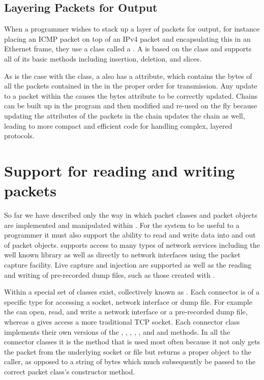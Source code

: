 \documentclass{sig-alternate-10pt}
\begin{document}
\subsection{Layering Packets for Output}
\label{sec:layering-packets-for-output}

When a programmer wishes to stack up a layer of packets for output,
for instance placing an ICMP packet on top of an IPv4 packet and
encapsulating this in an Ethernet frame, they use a class called a
.  A  is based on the  class
and supports all of its basic methods including insertion, deletion,
and slices.

As is the case with the  class, a  also has
a  attribute, which contains the bytes of all the packets
contained in the  in the proper order for transmission.
Any update to a packet within the  causes the bytes
attribute to be correctly updated.  Chains can be built up in the
program and then modified and re-used on the fly because updating the
attributes of the packets in the chain updates the chain as well,
leading to more compact and efficient code for handling complex,
layered protocols.

\section{Support for reading and writing packets}
\label{sec:support-for-reading-and-writing}

So far we have described only the way in which packet classes and
packet objects are implemented and manipulated within .
For the system to be useful to a programmer it must also support the
ability to read and write data into and out of packet objects.
 supports access to many types of network services
including the well known  library as well as directly
to network interfaces using the  packet capture
facility.  Live capture and injection are supported as well as the
reading and writing of pre-recorded dump files, such as those created
with .

Within  a special set of classes exist, collectively
known as .  Each connector is of a specific type for
accessing a socket, network interface or dump file.  For example the
 can open, read, and write a network interface or
a pre-recorded dump file, whereas a  gives access
a more traditional TCP socket.  Each connector class implements their
own versions of the , , ,
, , and  and
 methods.  In all the connector classes it is the
 method that is used most often because it not only
gets the packet from the underlying socket or file but returns a
proper object to the caller, as opposed to a string of bytes which
much subsequently be passed to the correct packet class's constructor
method.
\end{document}
